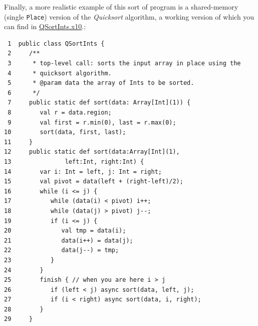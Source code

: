 Finally, a more realistic example of this sort of program is a shared-memory
(single {\tt Place}) version of the {\em Quicksort} algorithm, a working version
of which you can find in
\href{chapter-concurrency/QSortInts.x10}{QSortInts.x10}.:
\begin{verbatim}
 1  public class QSortInts {   
 2     /**
 3      * top-level call: sorts the input array in place using the
 4      * quicksort algorithm.
 5      * @param data the array of Ints to be sorted.
 6      */
 7     public static def sort(data: Array[Int](1)) {
 8        val r = data.region;
 9        val first = r.min(0), last = r.max(0);
10        sort(data, first, last); 
11     }
12     public static def sort(data:Array[Int](1), 
13               left:Int, right:Int) {
14        var i: Int = left, j: Int = right;
15        val pivot = data(left + (right-left)/2);
16        while (i <= j) {
17           while (data(i) < pivot) i++;
18           while (data(j) > pivot) j--;
19           if (i <= j) {
20              val tmp = data(i);
21              data(i++) = data(j);
22              data(j--) = tmp;
23           }
24        }
25        finish { // when you are here i > j 
26           if (left < j) async sort(data, left, j);
27           if (i < right) async sort(data, i, right);
28        }
29     }
\end{verbatim}
